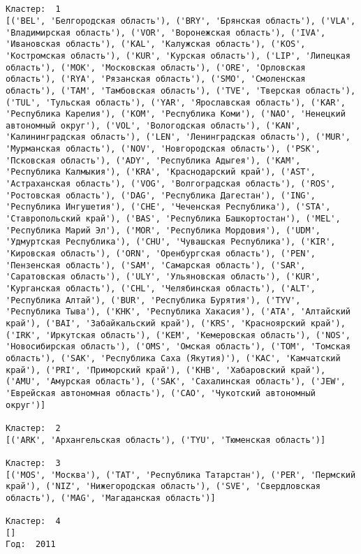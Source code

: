 \documentclass[11pt]{article}
\begin{document}
    \begin{center}
    \end{center}
    { \hspace*{\fill} \\}
    
    \begin{Verbatim}[commandchars=\\\{\}]

Кластер:  1
[('BEL', 'Белгородская область'), ('BRY', 'Брянская область'), ('VLA', 'Владимирская область'), ('VOR', 'Воронежская область'), ('IVA', 'Ивановская область'), ('KAL', 'Калужская область'), ('KOS', 'Костромская область'), ('KUR', 'Курская область'), ('LIP', 'Липецкая область'), ('MOK', 'Московская область'), ('ORE', 'Орловская область'), ('RYA', 'Рязанская область'), ('SMO', 'Смоленская область'), ('TAM', 'Тамбовская область'), ('TVE', 'Тверская область'), ('TUL', 'Тульская область'), ('YAR', 'Ярославская область'), ('KAR', 'Республика Карелия'), ('KOM', 'Республика Коми'), ('NAO', 'Ненецкий автономный округ'), ('VOL', 'Вологодская область'), ('KAN', 'Калинингpадская область'), ('LEN', 'Ленинградская область'), ('MUR', 'Мурманская область'), ('NOV', 'Новгородская область'), ('PSK', 'Псковская область'), ('ADY', 'Республика Адыгея'), ('KAM', 'Республика Калмыкия'), ('KRA', 'Краснодарский край'), ('AST', 'Астраханская область'), ('VOG', 'Волгоградская область'), ('ROS', 'Ростовская область'), ('DAG', 'Республика Дагестан'), ('ING', 'Республика Ингушетия'), ('CHE', 'Чеченская Республика'), ('STA', 'Ставропольский край'), ('BAS', 'Республика Башкортостан'), ('MEL', 'Республика Марий Эл'), ('MOR', 'Республика Мордовия'), ('UDM', 'Удмуртская Республика'), ('CHU', 'Чувашская Республика'), ('KIR', 'Кировская область'), ('ORN', 'Оренбургская область'), ('PEN', 'Пензенская область'), ('SAM', 'Самарская область'), ('SAR', 'Саратовская область'), ('ULY', 'Ульяновская область'), ('KUR', 'Курганская область'), ('CHL', 'Челябинская область'), ('ALT', 'Республика Алтай'), ('BUR', 'Республика Бурятия'), ('TYV', 'Республика Тыва'), ('KHK', 'Республика Хакасия'), ('ATA', 'Алтайский край'), ('BAI', 'Забайкальский край'), ('KRS', 'Красноярский край'), ('IRK', 'Иркутская область'), ('KEM', 'Кемеровская область'), ('NOS', 'Новосибирская область'), ('OMS', 'Омская область'), ('TOM', 'Томская область'), ('SAK', 'Республика Саха (Якутия)'), ('KAC', 'Камчатский край'), ('PRI', 'Приморский край'), ('KHB', 'Хабаровский край'), ('AMU', 'Амурская область'), ('SAK', 'Сахалинская область'), ('JEW', 'Еврейская автономная область'), ('CAO', 'Чукотский автономный округ')]

Кластер:  2
[('ARK', 'Архангельская область'), ('TYU', 'Тюменская область')]

Кластер:  3
[('MOS', 'Москва'), ('TAT', 'Республика Татарстан'), ('PER', 'Пермский край'), ('NIZ', 'Нижегородская область'), ('SVE', 'Свердловская область'), ('MAG', 'Магаданская область')]

Кластер:  4
[]
Год:  2011

    \end{Verbatim}
\end{document}
